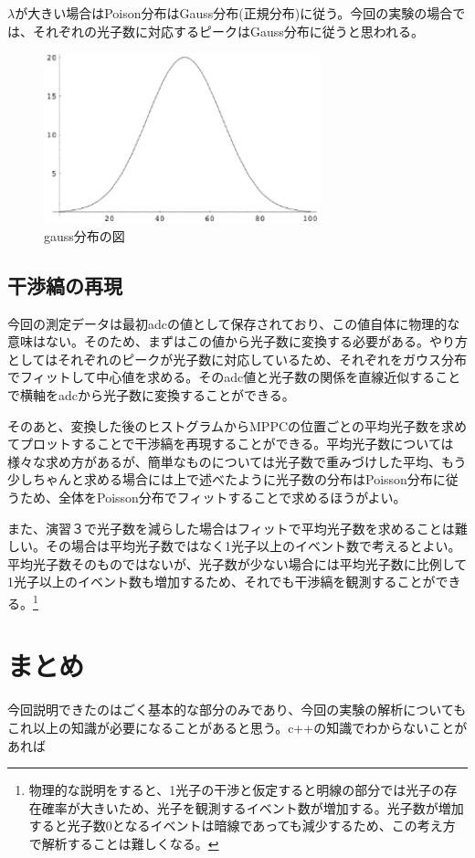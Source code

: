 \documentclass[10pt]{ujarticle}
\begin{document}
$\lambda$が大きい場合はPoison分布はGauss分布(正規分布)に従う。今回の実験の場合では、それぞれの光子数に対応するピークはGauss分布に従うと思われる。
\begin{figure}[h]
\begin{center}
\includegraphics[width=8cm]{SummerChallenge_gauss.png}
\caption{gauss分布の図}
\label{fig:gauss}
\end{center}
\end{figure}

\subsection{干渉縞の再現}
今回の測定データは最初adcの値として保存されており、この値自体に物理的な意味はない。そのため、まずはこの値から光子数に変換する必要がある。やり方としてはそれぞれのピークが光子数に対応しているため、それぞれをガウス分布でフィットして中心値を求める。そのadc値と光子数の関係を直線近似することで横軸をadcから光子数に変換することができる。

そのあと、変換した後のヒストグラムからMPPCの位置ごとの平均光子数を求めてプロットすることで干渉縞を再現することができる。平均光子数については様々な求め方があるが、簡単なものについては光子数で重みづけした平均、もう少しちゃんと求める場合には上で述べたように光子数の分布はPoisson分布に従うため、全体をPoisson分布でフィットすることで求めるほうがよい。

また、演習３で光子数を減らした場合はフィットで平均光子数を求めることは難しい。その場合は平均光子数ではなく1光子以上のイベント数で考えるとよい。平均光子数そのものではないが、光子数が少ない場合には平均光子数に比例して1光子以上のイベント数も増加するため、それでも干渉縞を観測することができる。\footnote{物理的な説明をすると、1光子の干渉と仮定すると明線の部分では光子の存在確率が大きいため、光子を観測するイベント数が増加する。光子数が増加すると光子数0となるイベントは暗線であっても減少するため、この考え方で解析することは難しくなる。}

\section{まとめ}
\label{sec:lastsection}
今回説明できたのはごく基本的な部分のみであり、今回の実験の解析についてもこれ以上の知識が必要になることがあると思う。c++の知識でわからないことがあれば
\end{document}
